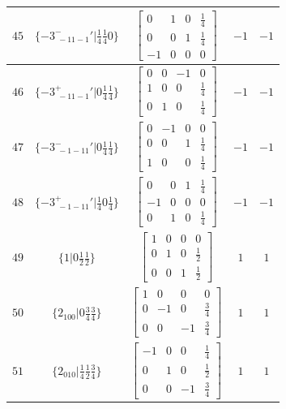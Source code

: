 \documentclass[fleqn,8pt]{jsarticle}
\begin{document}
\begin{longtable}{ccccc}
$ 45 $ & $ \{-3^{-}_{\,\,-11-1}{}'|\frac{1}{4} \frac{1}{4} 0\} $ & $ \begin{bmatrix} 0 & 1 & 0 & \frac{1}{4} \\ 0 & 0 & 1 & \frac{1}{4} \\ -1 & 0 & 0 & 0 \end{bmatrix} $ & $ -1 $ & $ -1 $ \\ \hline
$ 46 $ & $ \{-3^{+}_{\,\,-11-1}{}'|0 \frac{1}{4} \frac{1}{4}\} $ & $ \begin{bmatrix} 0 & 0 & -1 & 0 \\ 1 & 0 & 0 & \frac{1}{4} \\ 0 & 1 & 0 & \frac{1}{4} \end{bmatrix} $ & $ -1 $ & $ -1 $ \\ \hline
$ 47 $ & $ \{-3^{-}_{\,\,-1-11}{}'|0 \frac{1}{4} \frac{1}{4}\} $ & $ \begin{bmatrix} 0 & -1 & 0 & 0 \\ 0 & 0 & 1 & \frac{1}{4} \\ 1 & 0 & 0 & \frac{1}{4} \end{bmatrix} $ & $ -1 $ & $ -1 $ \\ \hline
$ 48 $ & $ \{-3^{+}_{\,\,-1-11}{}'|\frac{1}{4} 0 \frac{1}{4}\} $ & $ \begin{bmatrix} 0 & 0 & 1 & \frac{1}{4} \\ -1 & 0 & 0 & 0 \\ 0 & 1 & 0 & \frac{1}{4} \end{bmatrix} $ & $ -1 $ & $ -1 $ \\ \hline
$ 49 $ & $ \{1|0 \frac{1}{2} \frac{1}{2}\} $ & $ \begin{bmatrix} 1 & 0 & 0 & 0 \\ 0 & 1 & 0 & \frac{1}{2} \\ 0 & 0 & 1 & \frac{1}{2} \end{bmatrix} $ & $ 1 $ & $ 1 $ \\ \hline
$ 50 $ & $ \{2{}_{100}|0 \frac{3}{4} \frac{3}{4}\} $ & $ \begin{bmatrix} 1 & 0 & 0 & 0 \\ 0 & -1 & 0 & \frac{3}{4} \\ 0 & 0 & -1 & \frac{3}{4} \end{bmatrix} $ & $ 1 $ & $ 1 $ \\ \hline
$ 51 $ & $ \{2{}_{010}|\frac{1}{4} \frac{1}{2} \frac{3}{4}\} $ & $ \begin{bmatrix} -1 & 0 & 0 & \frac{1}{4} \\ 0 & 1 & 0 & \frac{1}{2} \\ 0 & 0 & -1 & \frac{3}{4} \end{bmatrix} $ & $ 1 $ & $ 1 $ \\ \hline

\end{longtable}
\end{document}
